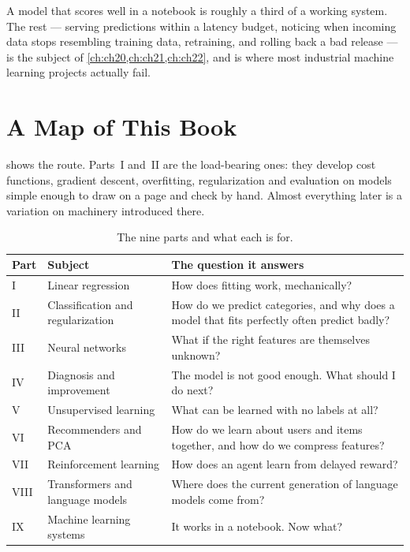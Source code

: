 A model that scores well in a notebook is roughly a third of a working system.
The rest --- serving predictions within a latency budget, noticing when incoming
data stops resembling training data, retraining, and rolling back a bad release
--- is the subject of \cref{ch:ch20,ch:ch21,ch:ch22}, and is where most
industrial machine learning projects actually fail.

\section{A Map of This Book}
\label{sec:map}

 shows the route. Parts~I and~II are the load-bearing ones: they
develop cost functions, gradient descent, overfitting, regularization and
evaluation on models simple enough to draw on a page and check by hand. Almost
everything later is a variation on machinery introduced there.

\begin{table}[htbp]
  \centering
  \small
  \renewcommand{\arraystretch}{1.25}
  \begin{tabular}{@{}L{1.1cm}L{4.4cm}L{5.6cm}@{}}
    \toprule
    \textbf{Part} & \textbf{Subject} & \textbf{The question it answers}\\
    \midrule
    I    & Linear regression &
      How does fitting work, mechanically?\\
    II   & Classification and regularization &
      How do we predict categories, and why does a model that fits perfectly
      often predict badly?\\
    III  & Neural networks &
      What if the right features are themselves unknown?\\
    IV   & Diagnosis and improvement &
      The model is not good enough. What should I do next?\\
    V    & Unsupervised learning &
      What can be learned with no labels at all?\\
    VI   & Recommenders and PCA &
      How do we learn about users and items together, and how do we compress
      features?\\
    VII  & Reinforcement learning &
      How does an agent learn from delayed reward?\\
    VIII & Transformers and language models &
      Where does the current generation of language models come from?\\
    IX   & Machine learning systems &
      It works in a notebook. Now what?\\
    \bottomrule
  \end{tabular}
  \caption{The nine parts and what each is for.}
  \label{tab:map}
\end{table}

